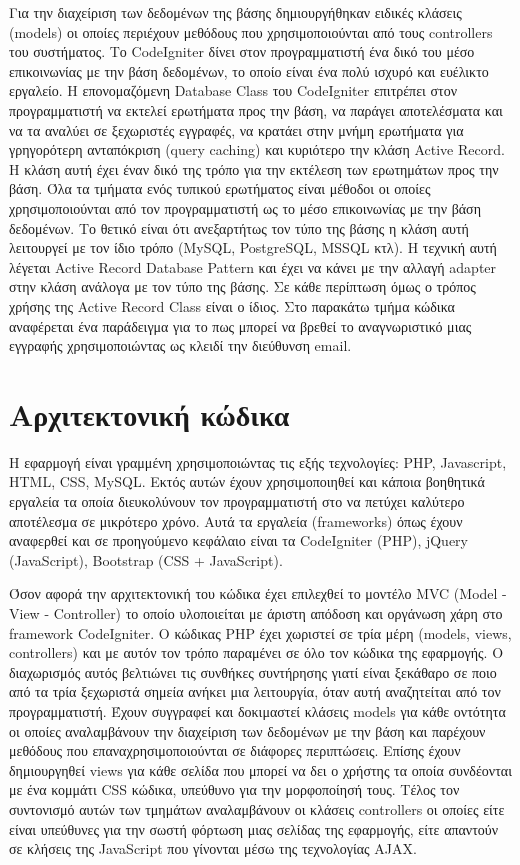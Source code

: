 Για την διαχείριση των δεδομένων της βάσης δημιουργήθηκαν ειδικές κλάσεις (models) οι οποίες περιέχουν μεθόδους που χρησιμοποιούνται από τους controllers του συστήματος. Το CodeIgniter δίνει στον προγραμματιστή ένα δικό του μέσο επικοινωνίας με την βάση δεδομένων, το οποίο είναι ένα πολύ ισχυρό και ευέλικτο εργαλείο. Η επονομαζόμενη Database Class του CodeIgniter επιτρέπει στον προγραμματιστή να εκτελεί ερωτήματα προς την βάση, να παράγει αποτελέσματα και να τα αναλύει σε ξεχωριστές εγγραφές, να κρατάει στην μνήμη ερωτήματα για γρηγορότερη ανταπόκριση (query caching) και κυριότερο την κλάση Active Record. Η κλάση αυτή έχει έναν δικό της τρόπο για την εκτέλεση των ερωτημάτων προς την βάση. Όλα τα τμήματα ενός τυπικού ερωτήματος είναι μέθοδοι οι οποίες χρησιμοποιούνται από τον προγραμματιστή ως το μέσο επικοινωνίας με την βάση δεδομένων. Το θετικό είναι ότι ανεξαρτήτως τον τύπο της βάσης η κλάση αυτή λειτουργεί με τον ίδιο τρόπο (MySQL, PostgreSQL, MSSQL κτλ). Η τεχνική αυτή λέγεται Active Record Database Pattern και έχει να κάνει με την αλλαγή adapter στην κλάση ανάλογα με τον τύπο της βάσης. Σε κάθε περίπτωση όμως ο τρόπος χρήσης της Active Record Class είναι ο ίδιος. Στο παρακάτω τμήμα κώδικα αναφέρεται ένα παράδειγμα για το πως μπορεί να βρεθεί το αναγνωριστικό μιας εγγραφής χρησιμοποιώντας ως κλειδί την διεύθυνση email.



\section{Αρχιτεκτονική κώδικα}
Η εφαρμογή είναι γραμμένη χρησιμοποιώντας τις εξής τεχνολογίες: PHP, Javascript, HTML, CSS, MySQL. Εκτός αυτών έχουν χρησιμοποιηθεί και κάποια βοηθητικά εργαλεία τα οποία διευκολύνουν τον προγραμματιστή στο να πετύχει καλύτερο αποτέλεσμα σε μικρότερο χρόνο. Αυτά τα εργαλεία (frameworks) όπως έχουν αναφερθεί και σε προηγούμενο κεφάλαιο είναι τα CodeIgniter (PHP), jQuery (JavaScript), Bootstrap (CSS + JavaScript). 

Όσον αφορά την αρχιτεκτονική του κώδικα έχει επιλεχθεί το μοντέλο MVC (Model - View - Controller) το οποίο υλοποιείται με άριστη απόδοση και οργάνωση χάρη στο framework CodeIgniter. Ο κώδικας PHP έχει χωριστεί σε τρία μέρη (models, views, controllers) και με αυτόν τον τρόπο παραμένει σε όλο τον κώδικα της εφαρμογής. Ο διαχωρισμός αυτός βελτιώνει τις συνθήκες συντήρησης γιατί είναι ξεκάθαρο σε ποιο από τα τρία ξεχωριστά σημεία ανήκει μια λειτουργία, όταν αυτή αναζητείται από τον προγραμματιστή. Έχουν συγγραφεί και δοκιμαστεί κλάσεις models για κάθε οντότητα οι οποίες αναλαμβάνουν την διαχείριση των δεδομένων με την βάση και παρέχουν μεθόδους που επαναχρησιμοποιούνται σε διάφορες περιπτώσεις. Επίσης έχουν δημιουργηθεί views για κάθε σελίδα που μπορεί να δει ο χρήστης τα οποία συνδέονται με ένα κομμάτι CSS κώδικα, υπεύθυνο για την μορφοποίησή τους. Τέλος τον συντονισμό αυτών των τμημάτων αναλαμβάνουν οι κλάσεις controllers οι οποίες είτε είναι υπεύθυνες για την σωστή φόρτωση μιας σελίδας της εφαρμογής, είτε απαντούν σε κλήσεις της JavaScript που γίνονται μέσω της τεχνολογίας AJAX.

